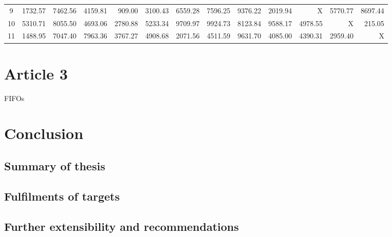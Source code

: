 \begin{table}
\begin{tabular}{c|rrrrrrrrrrrr}
		9  &  1732.57 &  7462.56 &  4159.81 &   909.00 &  3100.43 &  6559.28 &  7596.25 &  9376.22 &  2019.94 &      X &  5770.77 &  8697.44 \\
		10 &  5310.71 &  8055.50 &  4693.06 &  2780.88 &  5233.34 &  9709.97 &  9924.73 &  8123.84 &  9588.17 &  4978.55 &      X &   215.05 \\
		11 &  1488.95 &  7047.40 &  7963.36 &  3767.27 &  4908.68 &  2071.56 &  4511.59 &  9631.70 &  4085.00 &  4390.31 &  2959.40 &      X \\
	\end{tabular}
	\label{tab:example}
\end{table}


\chapter{Article 3} 
\lipsum 
\glspl{FIFO}




\chapter{Conclusion}
\section{Summary of thesis} \lipsum
\section{Fulfilments of targets} \lipsum
\section{Further extensibility and recommendations} \lipsum
